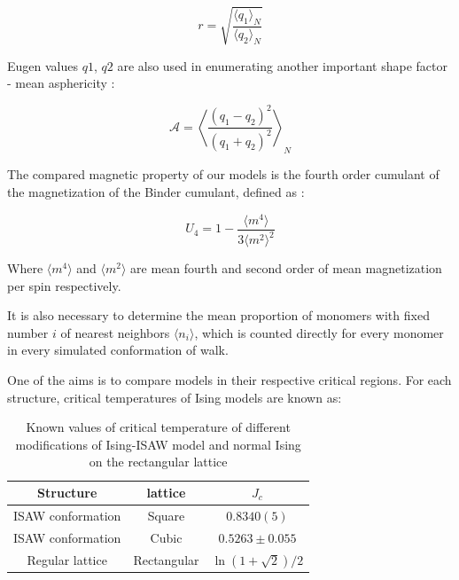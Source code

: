 \documentclass[a4paper]{jpconf}
\begin{document}
\begin{equation}
    r = \sqrt{\frac{\langle q_{1}\rangle_{N}}{\langle q_{2} \rangle_{N}}}
\end{equation}

Eugen values $q1$, $q2$ are also used in enumerating another important shape factor - mean asphericity \cite{Caracciolo2011}:

\begin{equation}
\label{eq:Asphericity}
    \mathcal{A} = \left\langle \frac{(q_{1} - q_{2})^{2}}{(q_{1} + q_{2})^{2}} \right\rangle_{N}
\end{equation}

The compared magnetic property of our models is the fourth order cumulant of the magnetization of the Binder cumulant, defined as \cite{Binder1981_Ising}:

\begin{equation}
\label{eq:Cumulant}
U_{4} = 1 - \frac{\langle m^{4} \rangle}{3 \langle m^{2} \rangle^{2}}
\end{equation}

Where $\langle m^{4} \rangle$ and $\langle m^{2} \rangle$ are mean fourth and second order of mean magnetization per spin respectively.

It is also necessary to determine the mean proportion of monomers with fixed number $i$ of nearest neighbors $\langle n_{i} \rangle$, which is counted directly for every monomer in every simulated conformation of walk.

One of the aims is to compare models in their respective critical regions. For each structure, critical temperatures of Ising models are known as:

\begin{table}[h]
    \centering
    \begin{tabular}{|c|c|c|}
        \hline
        Structure & lattice & $J_{c}$ \\ \hline
        ISAW conformation & Square & $0.8340(5)$\cite{faizullina2021critical} \\ \hline
        ISAW conformation & Cubic & $0.5263 \pm 0.055$\cite{Foster2021}\\ \hline
        Regular lattice & Rectangular & $\ln{(1 + \sqrt{2}) / 2}$\cite{Onsager}\\ \hline
    \end{tabular}
    \caption{Known values of critical temperature of different modifications of Ising-ISAW model and normal Ising on the rectangular lattice}
    \label{tab:Ising_T_c}
\end{table}
\end{document}
